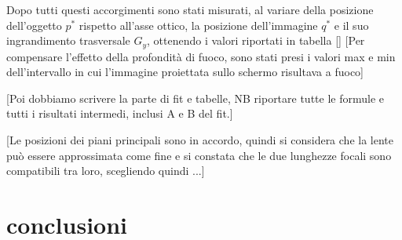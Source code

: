 \documentclass{article}
\begin{document}
Dopo tutti questi accorgimenti sono stati misurati, al variare della posizione dell'oggetto $p^*$ rispetto all'asse ottico, la posizione dell'immagine $q^*$ e il suo ingrandimento trasversale $G_y$, ottenendo i valori riportati in tabella []
[Per compensare l'effetto della profondità di fuoco, sono stati presi i valori max e min dell'intervallo in cui l'immagine proiettata sullo schermo risultava a fuoco]

[Poi dobbiamo scrivere la parte di fit e tabelle, 
NB riportare tutte le formule e tutti i risultati intermedi, inclusi A e B del fit.]

[Le posizioni dei piani principali sono in accordo, quindi si considera che la lente può essere approssimata come fine e si constata che le due lunghezze focali sono compatibili tra loro, scegliendo quindi ...]


\section{conclusioni}
\end{document}
